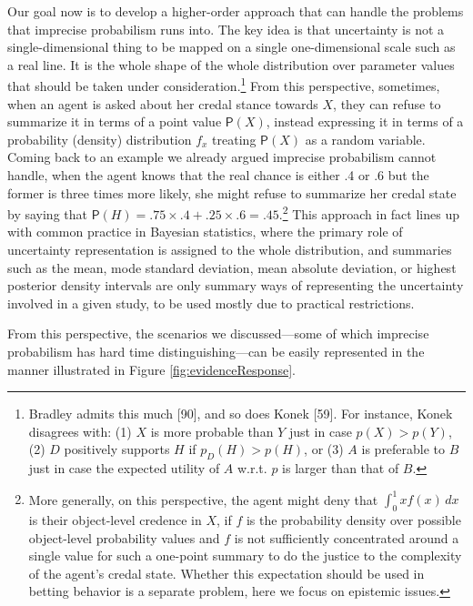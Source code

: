 \documentclass[
  10pt,
  dvipsnames,enabledeprecatedfontcommands]{scrartcl}
\begin{document}
Our goal now is to develop a higher-order approach that can handle the
problems that imprecise probabilism runs into. The key idea is that
uncertainty is not a single-dimensional thing to be mapped on a single
one-dimensional scale such as a real line. It is the whole shape of the
whole distribution over parameter values that should be taken under
consideration.\footnote{Bradley admits this much {[}90{]}, and
  so does Konek {[}59{]}. For instance, Konek disagrees with: (1) \(X\)
  is more probable than \(Y\) just in case \(p(X)>p(Y)\), (2) \(D\)
  positively supports \(H\) if \(p_D(H)> p(H)\), or (3) \(A\) is
  preferable to \(B\) just in case the expected utility of \(A\) w.r.t.
  \(p\) is larger than that of \(B\).} From this perspective, sometimes,
when an agent is asked about her credal stance towards \(X\), they can
refuse to summarize it in terms of a point value \(\mathsf{P}(X)\),
instead expressing it in terms of a probability (density) distribution
\(f_x\) treating \(\mathsf{P}(X)\) as a random variable. Coming back to
an example we already argued imprecise probabilism cannot handle, when
the agent knows that the real chance is either .4 or .6 but the former
is three times more likely, she might refuse to summarize her credal
state by saying that
\(\mathsf{P}(H) = .75 \times .4 + .25 \times .6 = .45\).\footnote{More
  generally, on this perspective, the agent might deny that
  \(\int_{0}^{1} x f(x) \, dx\) is their object-level credence in \(X\),
  if \(f\) is the probability density over possible object-level
  probability values and \(f\) is not sufficiently concentrated around a
  single value for such a one-point summary to do the justice to the
  complexity of the agent's credal state. Whether this expectation
  should be used in betting behavior is a separate problem, here we
  focus on epistemic issues.} This approach in fact lines up with common
practice in Bayesian statistics, where the primary role of uncertainty
representation is assigned to the whole distribution, and summaries such
as the mean, mode standard deviation, mean absolute deviation, or
highest posterior density intervals are only summary ways of
representing the uncertainty involved in a given study, to be used
mostly due to practical restrictions.

From this perspective, the scenarios we discussed---some of which
imprecise probabilism has hard time distinguishing---can be easily
represented in the manner illustrated in Figure
\ref{fig:evidenceResponse}.
\end{document}
